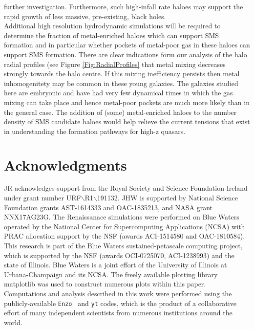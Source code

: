 \documentclass[graphics, twocolumn, usenatbib]{mn2e}
\newcommand{\enzo}{\texttt{Enzo~}}
\newcommand{\yt}{\texttt{yt}}
\begin{document}
further investigation. Furthermore, such high-infall rate haloes may support the rapid growth of less massive, pre-existing,
black holes. \\
\indent Additional high resolution hydrodynamic simulations will be required to
determine the fraction of metal-enriched haloes which can support SMS formation and in particular
whether pockets of metal-poor gas in these haloes can support SMS formation. There are clear
indications form our analysis of the halo radial profiles (see Figure \ref{Fig:RadialProfiles} that
metal mixing decreases strongly towards the halo centre. If this mixing inefficiency persists
then metal inhomogenitety may be common in these young galaxies. The galaxies studied here are
embryonic and have had very few dynamical times in which the
gas mixing can take place and hence metal-poor pockets are much more likely than in the general case.
The addition of (some) metal-enriched haloes to the number density of SMS
candidate haloes would help relieve the current tensions that exist in understanding the formation
pathways for high-z quasars. 

\section*{Acknowledgments}

JR acknowledges support from the Royal Society and Science Foundation Ireland under
grant number URF$\backslash$R1$\backslash$191132.
JHW is supported by National Science Foundation grants AST-1614333 and
OAC-1835213, and NASA grant NNX17AG23G.  The Renaissanace simulations were performed on Blue
Waters operated by the National Center for Supercomputing Applications (NCSA)
with PRAC allocation support by the NSF (awards ACI-1514580 and OAC-1810584).
This research is part of the Blue Waters sustained-petascale computing project, which
is supported by the NSF (awards OCI-0725070, ACI-1238993) and the state of
Illinois. Blue Waters is a joint effort of the University of Illinois at
Urbana-Champaign and its NCSA.  The freely available plotting library {\sc
matplotlib} \citep{matplotlib} was used to construct numerous plots within this
paper. Computations and analysis described in this work were performed using the
publicly-available \enzo \citep{Enzo_2014, Enzo_2019} and \yt{} \citep{YT} codes, which is the product of a
collaborative effort of many independent scientists from numerous institutions
around the world.



\end{document}
